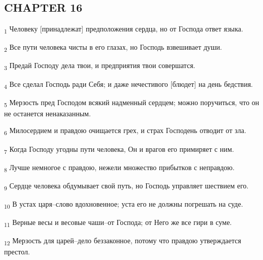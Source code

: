 \subsection{CHAPTER 16}
\begin{tcolorbox}
\textsubscript{1} Человеку [принадлежат] предположения сердца, но от Господа ответ языка.
\end{tcolorbox}
\begin{tcolorbox}
\textsubscript{2} Все пути человека чисты в его глазах, но Господь взвешивает души.
\end{tcolorbox}
\begin{tcolorbox}
\textsubscript{3} Предай Господу дела твои, и предприятия твои совершатся.
\end{tcolorbox}
\begin{tcolorbox}
\textsubscript{4} Все сделал Господь ради Себя; и даже нечестивого [блюдет] на день бедствия.
\end{tcolorbox}
\begin{tcolorbox}
\textsubscript{5} Мерзость пред Господом всякий надменный сердцем; можно поручиться, что он не останется ненаказанным.
\end{tcolorbox}
\begin{tcolorbox}
\textsubscript{6} Милосердием и правдою очищается грех, и страх Господень отводит от зла.
\end{tcolorbox}
\begin{tcolorbox}
\textsubscript{7} Когда Господу угодны пути человека, Он и врагов его примиряет с ним.
\end{tcolorbox}
\begin{tcolorbox}
\textsubscript{8} Лучше немногое с правдою, нежели множество прибытков с неправдою.
\end{tcolorbox}
\begin{tcolorbox}
\textsubscript{9} Сердце человека обдумывает свой путь, но Господь управляет шествием его.
\end{tcolorbox}
\begin{tcolorbox}
\textsubscript{10} В устах царя--слово вдохновенное; уста его не должны погрешать на суде.
\end{tcolorbox}
\begin{tcolorbox}
\textsubscript{11} Верные весы и весовые чаши--от Господа; от Него же все гири в суме.
\end{tcolorbox}
\begin{tcolorbox}
\textsubscript{12} Мерзость для царей--дело беззаконное, потому что правдою утверждается престол.
\end{tcolorbox}
